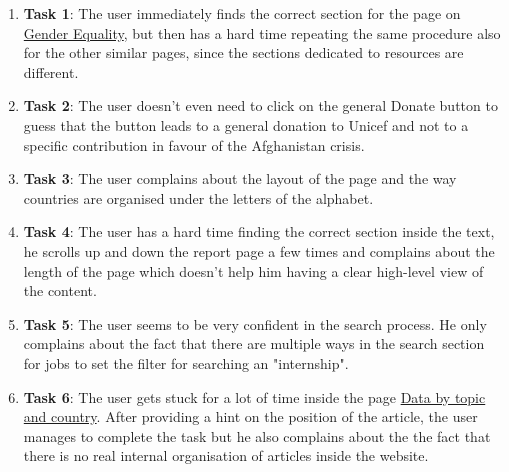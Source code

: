 \begin{enumerate}
	\item \textbf{Task 1}: The user immediately finds the correct section for the page on \href{https://www.unicef.org/gender-equality}{Gender Equality}, but then has a hard time repeating the same procedure also for the other similar pages, since the sections dedicated to resources are different.
	\item \textbf{Task 2}: The user doesn't even need to click on the general Donate button to guess that the button leads to a general donation to Unicef and not to a specific contribution in favour of the Afghanistan crisis.
	\item \textbf{Task 3}: The user complains about the layout of the page and the way countries are organised under the letters of the alphabet.
	\item \textbf{Task 4}: The user has a hard time finding the correct section inside the text, he scrolls up and down the report page a few times and complains about the length of the page which doesn't help him having a clear high-level view of the content.
	\item \textbf{Task 5}: The user seems to be very confident in the search process. He only complains about the fact that there are multiple ways in the search section for jobs to set the filter for searching an "internship".
	\item \textbf{Task 6}: The user gets stuck for a lot of time inside the page \href{https://data.unicef.org/?_gl=1\%2A1he5ywc\%2A_ga\%2AMTEzMTU1MTkxOS4xNzEwMTk2NDI2\%2A_ga_ZEPV2PX419\%2AMTcxMjYxMDM0Ni4yNi4xLjE3MTI2MTUzNDEuNjAuMC4w}{Data by topic and country}. After providing a hint on the position of the article, the user manages to complete the task but he also complains about the the fact that there is no real internal organisation of articles inside the website.
	
\end{enumerate}



\vspace{1cm}

